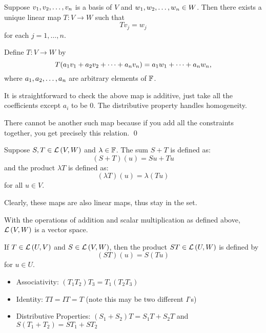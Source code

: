 \begin{theorem}
    Suppose $v_1, v_2, \ldots, v_n$ is a basis of $V$ and $w_1, w_2, \ldots, w_{n} \in W$. Then there
    exists a unique linear map $T : V \to W$ such that
    \[ Tv_j = w_j \]
    for each $j = 1, \dots, n$.

    \begin{proof*}
        Define $T: V \to W$ by
        \[ T(a_1v_1 + a_2v_2 + \cdots + a_nv_n) = a_1w_1 + \dots + a_nw_n, \]
        where $a_1, a_2, \ldots, a_n$ are arbitrary elements of $\operatorname{\mathbb{F}}$.

        It is straightforward to check the above map is additive, just take all the
        coefficients except $a_i$ to be 0. The distributive property handles homogeneity.

        There cannot be another such map because if you add all the constraints
        together, you get precisely this relation. \qed
    \end{proof*}
\end{theorem}

\begin{definition} 
   Suppose $S, T \in \mathcal{L} \left( V, W \right)$ and $\lambda \in \operatorname{\mathbb{F}}$. The sum $S+T$ is defined as:
   \[ (S+T)(u) = Su + Tu \]
    and the product $\lambda T$ is defined as:
    \[ (\lambda T)(u) = \lambda (Tu) \]
    for all $u \in V$.

    Clearly, these maps are also linear maps, thus stay in the set.
\end{definition}

\begin{note} 
   With the operations of addition and scalar multiplication as defined above, $\mathcal{L} \left( V, W \right)$
   is a vector space. 
\end{note}

\begin{definition} 
   If $T \in \mathcal{L} \left( U, V \right)$ and $S \in \mathcal{L} \left( V, W \right)$, then the product $ST \in \mathcal{L} \left( U, W \right)$ is defined by
   \[ (ST)(u) = S(Tu) \]
   for $u \in U$.
\end{definition}

\begin{note} 
   \begin{itemize}
       \item Associativity: $(T_1 T_2)T_3 = T_1(T_2 T_3)$
       \item Identity: $TI = IT = T$ (note this may be two different $I$'s)
       \item Distributive Properties: $(S_1 + S_2)T = S_1 T + S_2 T$ and $S(T_1 + T_2) = ST_1 + ST_2$
   \end{itemize} 
\end{note}

